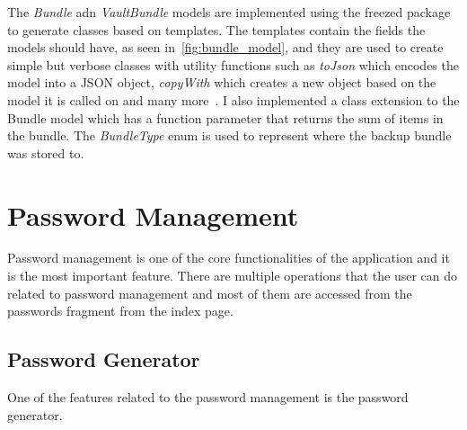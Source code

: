 \documentclass[a4paper,12pt]{report}
\begin{document}
The \textit{Bundle} adn \textit{VaultBundle} models are implemented using the
freezed package to generate classes based on templates. The templates contain
the fields the models should have, as seen in~\autoref{fig:bundle_model}, and
they are used to create simple but verbose classes with utility functions such
as \textit{toJson} which encodes the model into a JSON object,
\textit{copyWith} which creates a new object based on the model it is called on
and many more~\cite{freezedDocs}. I also implemented a class extension to the
Bundle model which has a function parameter that returns the sum of items in
the bundle. The \textit{BundleType} enum is used to represent where the backup
bundle was stored to.

\section{Password Management}

Password management is one of the core functionalities of the application and
it is the most important feature. There are multiple operations that the user
can do related to password management and most of them are accessed from the
passwords fragment from the index page.

\subsection{Password Generator}

One of the features related to the password management is the password
generator.
\end{document}
